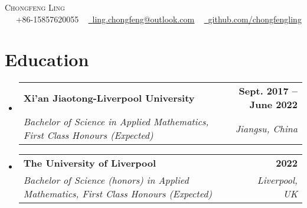 \documentclass[letterpaper,11pt]{article}
\makeatletter
\newcommand{\resumeSubheading}[4]{
  \vspace{-2pt}\item
    \begin{tabular*}{1.0\textwidth}[t]{l@{\extracolsep{\fill}}r}
      \textbf{#1} & \textbf{\small #2} \\
      \textit{\small#3} & \textit{\small #4} \\
    \end{tabular*}\vspace{-7pt}
}
\newcommand{\resumeSubHeadingListStart}{\begin{itemize}[leftmargin=0.0in, label={}]}
\newcommand{\resumeSubHeadingListEnd}{\end{itemize}}
\makeatother
\begin{document}

\begin{center}
    {\Huge \scshape Chongfeng Ling} \\ \vspace{1pt} ~
    \small \raisebox{-0.1\height}\faPhone\ +86-15857620055 ~ \href{mailto:ling.chongfeng@outlook.com}{\raisebox{-0.2\height}\faEnvelope\  \underline{ling.chongfeng@outlook.com}} ~ 
    \href{https://github.com/chongfengling}{\raisebox{-0.2\height}\faGithub\ \underline{github.com/chongfengling}}
    \vspace{-8pt}
\end{center}


\section{Education}
  \resumeSubHeadingListStart
    \resumeSubheading
      {Xi'an Jiaotong-Liverpool University}{Sept. 2017 -- June 2022}
      {Bachelor of Science in Applied Mathematics, First Class Honours (Expected)}{Jiangsu, China}

    \resumeSubheading
      {The University of Liverpool}{2022}
      {Bachelor of Science (honors) in Applied Mathematics, First Class Honours (Expected)}{Liverpool, UK}
  \resumeSubHeadingListEnd

\end{document}
